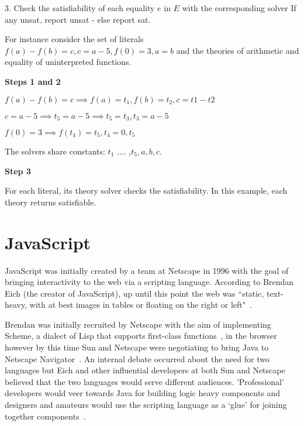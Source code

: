 \documentclass[]{final_report}
\begin{document}
3. Check the satisfiability of each equality $e$ in $E$ with the corresponding solver If any unsat, report unsat - else report sat.

For instance consider the set of literals $f(a) - f(b) = c, c = a -5, f(0) = 3, a = b$ and the theories of arithmetic and equality of uninterpreted functions.

\textbf{Steps 1 and 2}

$f(a) - f(b) = c \implies f(a) = t_1, f(b) = t_2, c = t1 - t2$

$c = a - 5 \implies t_5 = a - 5 \implies t_5 = t_3, t_3 = a- 5$

$f(0) =3 \implies f(t_4) = t_5, t_4 = 0, t_5$

The solvers share constants: $t_1$ .... ,$t_5, a, b, c$.

\textbf{Step 3}

For each literal, its theory solver checks the satisfiability. In this example, each theory returns satisfiable.

\chapter{JavaScript}

JavaScript was initially created by a team at Netscape in 1996 with the goal of bringing interactivity to the web via a scripting language. According to Brendan Eich (the creator of JavaScript), up until this point the web was ``static, text-heavy, with at best images in tables or floating on the right or left"~\cite{AZProgrammingLanguages}. 

Brendan was initially recruited by Netscape with the aim of implementing Scheme, a dialect of Lisp that supports first-class functions~\cite{dybvig1996scheme}, in the browser however by this time Sun and Netscape were negotiating to bring Java to Netscape Navigator~\cite{popularityofjavascript}. An internal debate occurred about the need for two languages but Eich and other influential developers at both Sun and Netscape believed that the two languages would serve different audiences. 'Professional' developers would veer towards Java for building logic heavy components and designers and amateurs would use the scripting language as a `glue' for joining together components~\cite{AZProgrammingLanguages}.
\end{document}
